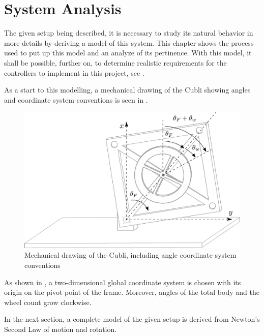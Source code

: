 \chapter{System Analysis}
The given setup being described, it is necessary to study its natural behavior in more details by deriving a model of this system. This chapter shows the process used to put up this model and an analyze of its pertinence. With this model, it shall be possible, further on, to determine realistic requirements for the controllers to implement in this project, see .

As a start to this modelling, a mechanical drawing of the Cubli showing angles and coordinate system conventions is seen in .

\begin{figure}[H]
 \centering
 \includegraphics[scale=0.6]{figures/mechanicalSystem}
 \caption{Mechanical drawing of the Cubli, including angle coordinate system conventions}
 \label{cubliMechanical}
\end{figure}

As shown in , a two-dimensional global coordinate system is chosen with its origin on the pivot point of the frame. Moreover, angles of the total body and the wheel count grow clockwise.

In the next section, a complete model of the given setup is derived from Newton's Second Law of motion and rotation.